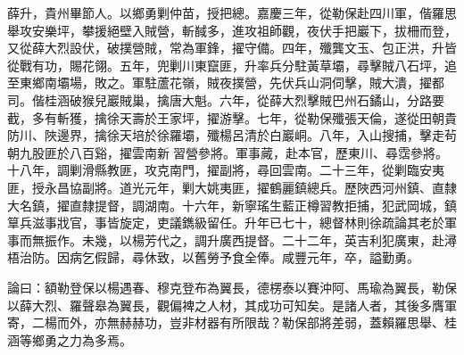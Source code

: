 \begin{pinyinscope}
薛升，貴州畢節人。以鄉勇剿仲苗，授把總。嘉慶三年，從勒保赴四川軍，偕羅思舉攻安樂坪，攀援絕壁入賊營，斬馘多，進攻祖師觀，夜伏手把巖下，拔柵而登，又從薛大烈設伏，破撲營賊，常為軍鋒，擢守備。四年，殲龔文玉、包正洪，升皆從戰有功，賜花翎。五年，兜剿川東竄匪，升率兵分駐黃草壩，尋擊賊八石坪，追至東鄉南壩場，敗之。軍駐蘆花嶺，賊夜撲營，先伏兵山洞伺擊，賊大潰，擢都司。偕桂涵破猴兒巖賊巢，擒唐大魁。六年，從薛大烈擊賊巴州石鐍山，分路要截，多有斬獲，擒徐天壽於王家坪，擢游擊。七年，從勒保殲張天倫，遂從田朝貴防川、陜邊界，擒徐天培於徐羅壩，殲楊呂清於白巖峒。八年，入山搜捕，擊走茍朝九股匪於八百谿，擢雲南新習營參將。軍事蕆，赴本官，歷東川、尋霑參將。十八年，調剿滑縣教匪，攻克南門，擢副將，尋回雲南。二十三年，從剿臨安夷匪，授永昌協副將。道光元年，剿大姚夷匪，擢鶴麗鎮總兵。歷陜西河州鎮、直隸大名鎮，擢直隸提督，調湖南。十六年，新寧瑤生藍正樽習教拒捕，犯武岡城，鎮筸兵滋事戕官，事皆旋定，吏議鐫級留任。升年已七十，總督林則徐疏論其老於軍事而無振作。未幾，以楊芳代之，調升廣西提督。二十二年，英吉利犯廣東，赴潯梧治防。因病乞假歸，尋休致，以舊勞予食全俸。咸豐元年，卒，謚勤勇。

論曰：額勒登保以楊遇春、穆克登布為翼長，德楞泰以賽沖阿、馬瑜為翼長，勒保以薛大烈、羅聲皋為翼長，觀偏裨之人材，其成功可知矣。是諸人者，其後多膺軍寄，二楊而外，亦無赫赫功，豈非材器有所限哉？勒保部將差弱，蓋賴羅思舉、桂涵等鄉勇之力為多焉。


\end{pinyinscope}